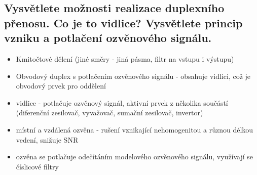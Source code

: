\subsection{Vysvětlete možnosti realizace duplexního přenosu. Co je to vidlice? Vysvětlete princip
vzniku a potlačení ozvěnového signálu.}
\begin{itemize}
    \item Kmitočtové dělení (jiné směry - jiná pásma, filtr na vstupu i výstupu)
    \item Obvodový duplex s potlačením ozvěnového signálu - obsahuje vidlici, což je obvodový prvek pro oddělení
    \item vidlice - potlačuje ozvěnový signál, aktivní prvek z několika součástí (diferenční zesilovač, vyvažovač,
    sumační zesilovač, invertor)
    \item místní a vzdálená ozvěna - rušení vznikající nehomogenitou a různou délkou vedení, snižuje SNR
    \item ozvěna se potlačuje odečítáním modelového ozvěnového signálu, využívají se číslicové filtry
\end{itemize}
